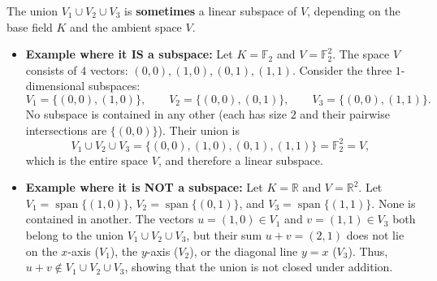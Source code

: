 \begin{exercisesolution}
\label{sol:union_three_subspaces}
The union $V_1 \cup V_2 \cup V_3$ is \textbf{sometimes} a linear subspace of $V$, depending on the base field $K$ and the ambient space $V$.

\begin{itemize}
    \item \textbf{Example where it IS a subspace:}
    Let $K = \mathbb{F}_2$ and $V = \mathbb{F}_2^2$. The space $V$ consists of $4$ vectors: $(0,0), (1,0), (0,1), (1,1)$. Consider the three $1$-dimensional subspaces:
    \[
    V_1 = \{(0,0), (1,0)\}, \qquad V_2 = \{(0,0), (0,1)\}, \qquad V_3 = \{(0,0), (1,1)\}.
    \]
    No subspace is contained in any other (each has size $2$ and their pairwise intersections are $\{(0,0)\}$). Their union is
    \[
    V_1 \cup V_2 \cup V_3 = \{(0,0), (1,0), (0,1), (1,1)\} = \mathbb{F}_2^2 = V,
    \]
    which is the entire space $V$, and therefore a linear subspace.

    \item \textbf{Example where it is NOT a subspace:}
    Let $K = \mathbb{R}$ and $V = \mathbb{R}^2$. Let $V_1 = \operatorname{span}\{(1,0)\}$, $V_2 = \operatorname{span}\{(0,1)\}$, and $V_3 = \operatorname{span}\{(1,1)\}$. None is contained in another.
    The vectors $u = (1, 0) \in V_1$ and $v = (1, 1) \in V_3$ both belong to the union $V_1 \cup V_2 \cup V_3$, but their sum $u + v = (2, 1)$ does not lie on the $x$-axis ($V_1$), the $y$-axis ($V_2$), or the diagonal line $y = x$ ($V_3$). Thus, $u + v \notin V_1 \cup V_2 \cup V_3$, showing that the union is not closed under addition.
\end{itemize}
\end{exercisesolution}

